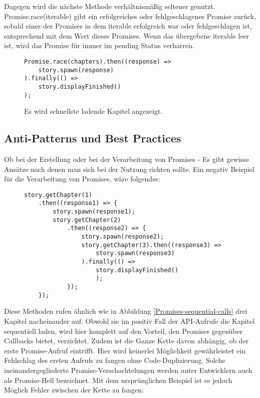 \noindent
Dagegen wird die nächste Methode verhältnismäßig seltener genutzt. Promise.race(iterable) gibt ein erfolgreiches oder fehlgeschlagenes Promise zurück, sobald eines der Promises in dem iterable erfolgreich war oder fehlgeschlagen ist, entsprechend mit dem Wert dieses Promises. Wenn das übergebene iterable leer ist, wird das Promise für immer im pending Status verharren.\cite{promise-race}

\begin{figure}[H]
\begin{lstlisting}[basicstyle=\small]
Promise.race(chapters).then((response) =>
    story.spawn(response)
).finally(() =>
    story.displayFinished()
);
\end{lstlisting}
\caption{Es wird schnellste ladende Kapitel angezeigt.}
\end{figure}

\subsection{Anti-Patterns und Best Practices}

Ob bei der Erstellung oder bei der Verarbeitung von Promises - Es gibt gewisse Ansätze nach denen man sich bei der Nutzung richten sollte. Ein negativ Beispiel für die Verarbeitung von Promises, wäre folgendes:

\begin{figure}[H]
\begin{lstlisting}[basicstyle=\small]
story.getChapter(1)
    .then((response1) => {
        story.spawn(response1);
        story.getChapter(2)
            .then((response2) => {
                story.spawn(response2);
                story.getChapter(3).then((response3) =>
                    story.spawn(response3)
                ).finally(() => 
                    story.displayFinished()
                    );
            });
    });
\end{lstlisting}
\end{figure}

\noindent
Diese Methoden rufen ähnlich wie in Abbildung \ref{Promises-sequential-calls} drei Kapitel nacheinander auf. Obwohl sie im positiv Fall der API-Aufrufe die Kapitel sequentiell laden, wird hier komplett auf den Vorteil, den Promises gegenüber Callbacks bietet, verzichtet. Zudem ist die Ganze Kette davon abhängig, ob der erste Promise-Aufruf eintrifft. Hier wird keinerlei Möglichkeit gewährleistet ein Fehlschlag des ersten Aufrufs zu fangen ohne Code-Duplizierung. Solche ineinandergegliederte Promise-Verschachtelungen werden unter Entwicklern auch als \glqq{}Promise-Hell\grqq{} bezeichnet.
Mit dem ursprünglichen Beispiel ist es jedoch Möglich Fehler zwischen der Kette zu fangen:

